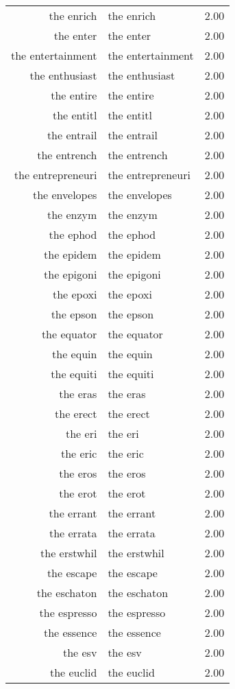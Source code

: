 \begin{table}[ht]
\begin{tabular}{rlr}
  the enrich & the enrich & 2.00 \\ 
  the enter & the enter & 2.00 \\ 
  the entertainment & the entertainment & 2.00 \\ 
  the enthusiast & the enthusiast & 2.00 \\ 
  the entire & the entire & 2.00 \\ 
  the entitl & the entitl & 2.00 \\ 
  the entrail & the entrail & 2.00 \\ 
  the entrench & the entrench & 2.00 \\ 
  the entrepreneuri & the entrepreneuri & 2.00 \\ 
  the envelopes & the envelopes & 2.00 \\ 
  the enzym & the enzym & 2.00 \\ 
  the ephod & the ephod & 2.00 \\ 
  the epidem & the epidem & 2.00 \\ 
  the epigoni & the epigoni & 2.00 \\ 
  the epoxi & the epoxi & 2.00 \\ 
  the epson & the epson & 2.00 \\ 
  the equator & the equator & 2.00 \\ 
  the equin & the equin & 2.00 \\ 
  the equiti & the equiti & 2.00 \\ 
  the eras & the eras & 2.00 \\ 
  the erect & the erect & 2.00 \\ 
  the eri & the eri & 2.00 \\ 
  the eric & the eric & 2.00 \\ 
  the eros & the eros & 2.00 \\ 
  the erot & the erot & 2.00 \\ 
  the errant & the errant & 2.00 \\ 
  the errata & the errata & 2.00 \\ 
  the erstwhil & the erstwhil & 2.00 \\ 
  the escape & the escape & 2.00 \\ 
  the eschaton & the eschaton & 2.00 \\ 
  the espresso & the espresso & 2.00 \\ 
  the essence & the essence & 2.00 \\ 
  the esv & the esv & 2.00 \\ 
  the euclid & the euclid & 2.00 \\ 

\end{tabular}
\end{table}
